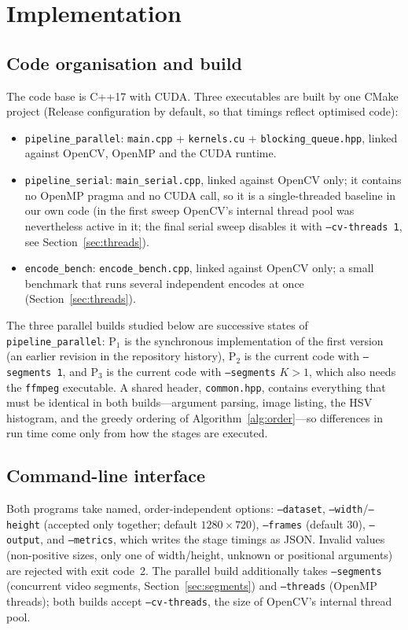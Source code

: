 \documentclass[conference]{IEEEtran}
\begin{document}
\section{Implementation}

\subsection{Code organisation and build}
\label{sec:impl-baseline}
The code base is C++17 with CUDA. Three executables are built by one CMake project (Release configuration by default, so that timings reflect optimised code):
\begin{itemize}
  \item \texttt{pipeline\_parallel}: \texttt{main.cpp} + \texttt{kernels.cu} + \texttt{blocking\_queue.hpp}, linked against OpenCV, OpenMP and the CUDA runtime.
  \item \texttt{pipeline\_serial}: \texttt{main\_serial.cpp}, linked against OpenCV only; it contains no OpenMP pragma and no CUDA call, so it is a single-threaded baseline in our own code (in the first sweep OpenCV's internal thread pool was nevertheless active in it; the final serial sweep disables it with \texttt{--cv-threads 1}, see Section~\ref{sec:threads}).
  \item \texttt{encode\_bench}: \texttt{encode\_bench.cpp}, linked against OpenCV only; a small benchmark that runs several independent encodes at once (Section~\ref{sec:threads}).
\end{itemize}
The three parallel builds studied below are successive states of \texttt{pipeline\_parallel}: P$_1$ is the synchronous implementation of the first version (an earlier revision in the repository history), P$_2$ is the current code with \texttt{--segments 1}, and P$_3$ is the current code with \texttt{--segments} $K>1$, which also needs the \texttt{ffmpeg} executable.
A shared header, \texttt{common.hpp}, contains everything that must be identical in both builds---argument parsing, image listing, the HSV histogram, and the greedy ordering of Algorithm~\ref{alg:order}---so differences in run time come only from how the stages are executed.

\subsection{Command-line interface}
Both programs take named, order-independent options: \texttt{--dataset}, \texttt{--width}/\texttt{--height} (accepted only together; default $1280\times720$), \texttt{--frames} (default $30$), \texttt{--output}, and \texttt{--metrics}, which writes the stage timings as JSON. Invalid values (non-positive sizes, only one of width/height, unknown or positional arguments) are rejected with exit code~2. The parallel build additionally takes \texttt{--segments} (concurrent video segments, Section~\ref{sec:segments}) and \texttt{--threads} (OpenMP threads); both builds accept \texttt{--cv-threads}, the size of OpenCV's internal thread pool.
\end{document}
